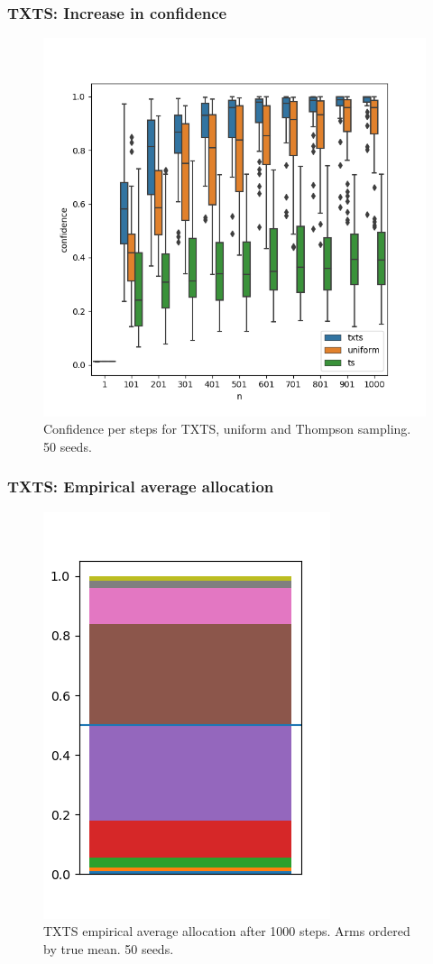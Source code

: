 \documentclass[aspectratio=43]{beamer}
\begin{document}
\begin{frame}
\frametitle{TXTS: Increase in confidence}
\begin{figure}[h]
  \centering
  \includegraphics[width=.55\textwidth]{190723-confidences.png}
  \caption{Confidence per steps for TXTS, uniform and Thompson sampling. 50
      seeds.}
  \label{fig:confidences}
\end{figure}
\end{frame}

\begin{frame}
\frametitle{TXTS: Empirical average allocation}
\begin{figure}[h]
  \centering
  \includegraphics[width=.35\textwidth]{190723-selections_2.png}
  \caption{TXTS empirical average allocation after 1000 steps. Arms ordered by true mean. 50 seeds.}
  \label{fig:measurement_plan}
\end{figure}
\end{frame}

\begin{frame}
\end{frame}
\end{document}
